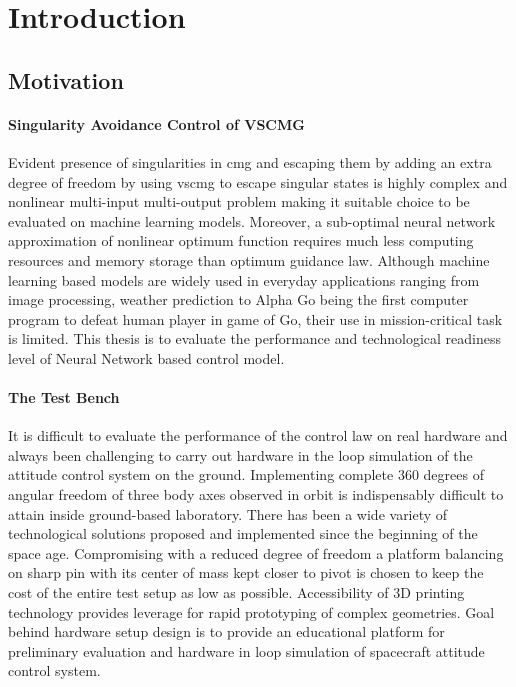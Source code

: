 \chapter{Introduction}
\label{chap:1}
\section{Motivation}


\subsubsection*{Singularity Avoidance Control of VSCMG}
Evident presence of singularities in \acrfull{cmg} and escaping them by adding an extra degree of freedom by using \acrfull{vscmg} to escape singular states is highly complex and nonlinear multi-input multi-output problem making it suitable choice to be evaluated on machine learning models. Moreover, a sub-optimal neural network approximation of nonlinear optimum function requires much less computing resources and memory storage than optimum guidance law\cite{Santoni1996}. Although machine learning based models are widely used in everyday applications ranging from image processing, weather prediction to Alpha Go being the first computer program to defeat human player in game of Go, \cite{Silver2016} their use in mission-critical task is limited.  This thesis is to evaluate the performance and technological readiness level of Neural Network based control model. 

\subsubsection*{The Test Bench}
It is difficult to evaluate the performance of the control law on real hardware and always been challenging to carry out hardware in the loop simulation of the attitude control system on the ground. Implementing complete 360 degrees of angular freedom of three body axes observed in orbit is indispensably difficult to attain inside ground-based laboratory. There has been a wide variety of technological solutions proposed and implemented since the beginning of the space age. Compromising with a reduced degree of freedom a platform balancing on sharp pin with its center of mass kept closer to pivot is chosen to keep the cost of the entire test setup as low as possible. 
Accessibility of 3D printing technology provides leverage for rapid prototyping of complex geometries. Goal behind hardware setup design is to provide an educational platform for preliminary evaluation and hardware in loop simulation of spacecraft attitude control system.

